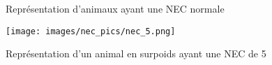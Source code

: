 \begin{figure}[!ht]
	
	{
		\begin{center}
		\end{center}
	}
	\caption[Représentation d'animaux ayant une note corporelle normale et dans la moyenne]
	{Représentation d'animaux ayant une NEC normale  \label{fig:nec_2}}
\end{figure}

\begin{figure}[!ht]
\begin{center}
	\texttt{[image: images/nec\_pics/nec\_5.png]}
	\caption[Représentation d'un animal en surpoids ayant une note d'état corporel de 5]
	{Représentation d'un animal en surpoids ayant une NEC de 5  \label{fig:nec_3}}
\end{center}
\end{figure}
